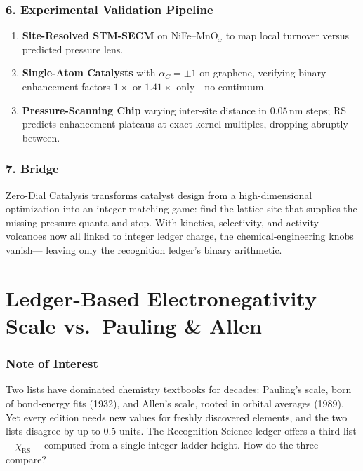 \documentclass[11pt,oneside]{book}
\begin{document}
\subsubsection*{6. Experimental Validation Pipeline}

\begin{enumerate}[label=\textbf{\arabic*.}, leftmargin=1.2cm]
\item \textbf{Site-Resolved STM-SECM} on NiFe–MnO\(_x\) to map local
      turnover versus predicted pressure lens.
\item \textbf{Single-Atom Catalysts} with \(\alpha_C=\pm1\) on graphene,
      verifying binary enhancement factors \(1\times\) or \(1.41\times\)
      only—no continuum.
\item \textbf{Pressure-Scanning Chip} varying inter-site distance in
      \(0.05\,\text{nm}\) steps; RS predicts enhancement plateaus at exact
      kernel multiples, dropping abruptly between.
\end{enumerate}

\subsubsection*{7. Bridge}

Zero-Dial Catalysis transforms catalyst design from a high-dimensional
optimization into an integer-matching game:
find the lattice site that supplies the missing pressure quanta
and stop.  
With kinetics, selectivity, and activity volcanoes now all linked to
integer ledger charge, the chemical‐engineering knobs vanish—
leaving only the recognition ledger’s binary arithmetic.

\bigskip
\section{Ledger-Based Electronegativity Scale vs.\ Pauling \& Allen}
\label{sec:chi-comparison}

\subsubsection*{Note of Interest}

Two lists have dominated chemistry textbooks for decades:
Pauling’s scale, born of bond‐energy fits (1932),
and Allen’s scale, rooted in orbital averages (1989).
Yet every edition needs new values for freshly discovered elements,
and the two lists disagree by up to 0.5 units.
The Recognition‐Science ledger offers a third list—\(\chi_{\text{RS}}\)—
computed from a single integer ladder height.
How do the three compare?
\end{document}
